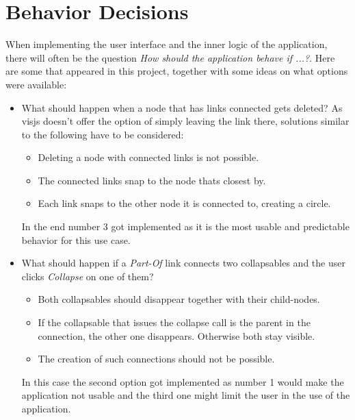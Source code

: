 \newpage
\section{Behavior Decisions}
When implementing the user interface and the inner logic of the application, there will often be the question \emph{How should the application behave if ...?}. Here are some that appeared in this project, together with some ideas on what options were available:
\begin{itemize}
\item What should happen when a node that has links connected gets deleted? As visjs doesn't offer the option of simply leaving the link there, solutions similar to the following have to be considered:
\begin{itemize}
\item Deleting a node with connected links is not possible.
\item The connected links snap to the node thats closest by.
\item Each link snaps to the other node it is connected to, creating a circle.
\end{itemize}
In the end number 3 got implemented as it is the most usable and predictable behavior for this use case.

\item What should happen if a \emph{Part-Of} link connects two collapsables and the user clicks \emph{Collapse} on one of them?
\begin{itemize}
\item Both collapsables should disappear together with their child-nodes.
\item If the collapsable that issues the collapse call is the parent in the connection, the other one disappears. Otherwise both stay visible.
\item The creation of such connections should not be possible.
\end{itemize}
In this case the second option got implemented as number 1 would make the application not usable and the third one might limit the user in the use of the application.


\end{itemize}
